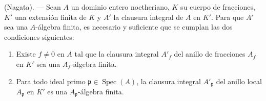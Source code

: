 \begin{proposition}[6.13.6]
\label{IV.2.s6.13.6-fr}
\textnormal{(Nagata).} --- Sean $A$ un dominio entero noetheriano, $K$ su
cuerpo de fracciones, $K'$ una extensión finita de $K$ y $A'$ la clausura
integral de $A$ en $K'$. Para que $A'$ sea una $A$-álgebra finita, es
necesario y suficiente que se cumplan las dos condiciones siguientes:
\begin{enumerate}
\item[\textup{(i)}] Existe $f\neq0$ en $A$ tal que la clausura integral $A'_f$
del anillo de fracciones $A_f$ en $K'$ sea una $A_f$-álgebra finita.
\item[\textup{(ii)}] Para todo ideal primo $\mathfrak p\in\operatorname{Spec}(A)$,
la clausura integral $A'_\mathfrak p$ del anillo local $A_\mathfrak p$
en $K'$ es una $A_\mathfrak p$-álgebra finita.
\end{enumerate}
\end{proposition}
